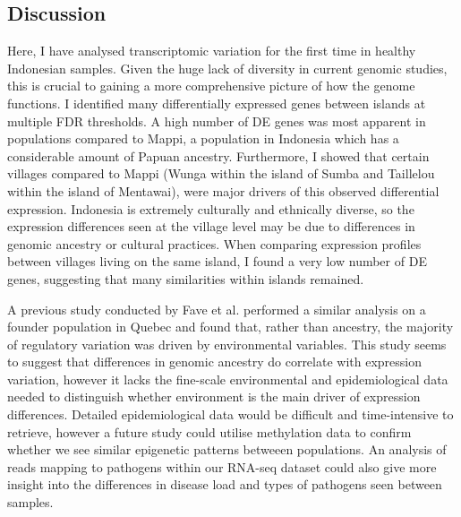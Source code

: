 \documentclass[12pt,a4paper,titlepage,twoside,openright]{book}
\begin{document}
\begin{mainmatter}
{{\chapter{Discussion}\label{}


Here, I have analysed transcriptomic variation for the first time in healthy Indonesian samples. Given the huge lack of diversity in current genomic studies, this is crucial to gaining a more comprehensive picture of how the genome functions. I identified many differentially expressed genes between islands at multiple FDR thresholds. A high number of DE genes was most apparent in populations compared to Mappi, a population in Indonesia which has a considerable amount of Papuan ancestry. Furthermore, I showed that certain villages compared to Mappi (Wunga within the island of Sumba and Taillelou within the island of Mentawai), were major drivers of this observed differential expression. Indonesia is extremely culturally and ethnically diverse, so the expression differences seen at the village level may be due to differences in genomic ancestry or cultural practices. 
When comparing expression profiles between villages living on the same island, I found a very low number of DE genes, suggesting that many similarities within islands remained.

A previous study conducted by Fave et al. \cite{fave2018gene} performed a similar analysis on a founder population in Quebec and found that, rather than ancestry, the majority of regulatory variation was driven by environmental variables. This study seems to suggest that differences in genomic ancestry do correlate with expression variation, however it lacks the fine-scale environmental and epidemiological data needed to distinguish whether environment is the main driver of expression differences. Detailed epidemiological data would be difficult and time-intensive to retrieve, however a future study could utilise methylation data to confirm whether we see similar epigenetic patterns betweeen populations. An analysis of reads mapping to pathogens within our RNA-seq dataset could also give more insight into the differences in disease load and types of pathogens seen between samples. 

}}
\end{mainmatter}
\end{document}
